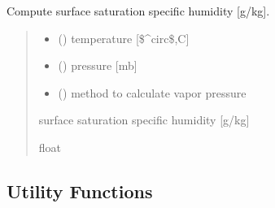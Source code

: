\documentclass[letterpaper,10pt,english]{sphinxmanual}
\begin{document}
\begin{fulllineitems}
\label{\detokenize{users_guide:hum_subs.qsat_sea}}
\pysigstartsignatures
{}
\pysigstopsignatures
\sphinxAtStartPar
Compute surface saturation specific humidity {[}g/kg{]}.
\begin{quote}\begin{description}
\begin{itemize}
\item {} 
\sphinxAtStartPar
{} () \textendash{} temperature {[}\$\textasciicircum{}circ\$,C{]}

\item {} 
\sphinxAtStartPar
{} () \textendash{} pressure {[}mb{]}

\item {} 
\sphinxAtStartPar
{} () \textendash{} method to calculate vapor pressure

\end{itemize}

\sphinxAtStartPar
{} \textendash{} surface saturation specific humidity {[}g/kg{]}

\sphinxAtStartPar
float

\end{description}\end{quote}

\end{fulllineitems}



\subsection{Utility Functions}
\label{\detokenize{users_guide:module-util_subs}}\label{\detokenize{users_guide:utility-functions}}
\end{document}
